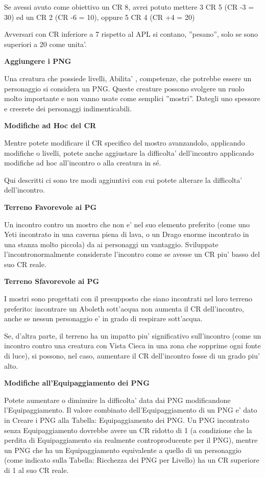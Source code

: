 \documentclass[a4paper,11pt,twoside,openany]{book}
\begin{document}
{		Se avessi avuto come obiettivo un CR 8, avrei potuto mettere 3 CR 5 (CR -3 = 30) ed un CR 2 (CR -6 = 10), oppure 5 CR 4 (CR +4 = 20)
		
		Avversari con CR inferiore a 7 rispetto al APL si contano, ''pesano'', solo se sono superiori a 20 come unita'.
		
		\textbf{Aggiungere i PNG}
		
		Una creatura che possiede livelli, Abilita' , competenze, che potrebbe essere un personaggio si considera un PNG. Queste creature possono svolgere un ruolo molto importante e non vanno usate come semplici ''mostri''. Dategli uno spessore e creerete dei personaggi indimenticabili.
		
		\textbf{Modifiche ad Hoc del CR}
		
		Mentre potete modificare il CR specifico del mostro avanzandolo, applicando modifiche o livelli, potete anche aggiustare la difficolta' dell'incontro applicando modifiche ad hoc all'incontro o alla creatura in sé. 
		
		Qui descritti ci sono tre modi aggiuntivi con cui potete alterare la difficolta' dell'incontro.
		
		\textbf{Terreno Favorevole ai PG}
		
		Un incontro contro un mostro che non e' nel suo elemento preferito (come uno Yeti incontrato in una caverna piena di lava, o un Drago enorme incontrato in una stanza molto piccola) da ai personaggi un vantaggio. Sviluppate l'incontronormalmente considerate l'incontro come se avesse un CR piu' basso del suo CR reale.
		
		\textbf{Terreno Sfavorevole ai PG}
		
		I mostri sono progettati con il presupposto che siano incontrati nel loro terreno preferito: incontrare un Aboleth sott’acqua non aumenta il CR dell'incontro, anche se nessun personaggio e' in grado di respirare sott'acqua. 
		
		Se, d’altra parte, il terreno ha un impatto piu' significativo sull'incontro (come un incontro contro una creatura con Vista Cieca in una zona che sopprime ogni fonte di luce), si possono, nel caso, aumentare il CR dell'incontro fosse di un grado piu' alto.
		
		
		\textbf{Modifiche all'Equipaggiamento dei PNG}
		
		Potete aumentare o diminuire la difficolta' data dai PNG modificandone l'Equipaggiamento. Il valore combinato dell'Equipaggiamento di un PNG e' dato in Creare i PNG alla Tabella: Equipaggiamento dei PNG. Un PNG incontrato senza Equipaggiamento dovrebbe avere un CR ridotto di 1 (a condizione che la perdita di Equipaggiamento sia realmente controproducente per il PNG), mentre un PNG che ha un Equipaggiamento equivalente a quello di un personaggio (come indicato sulla Tabella: Ricchezza dei PNG per Livello) ha un CR superiore di 1 al suo CR reale.
		
}
\end{document}
